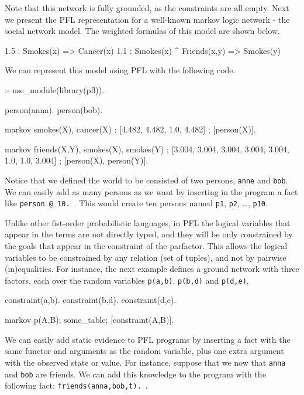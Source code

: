 \documentclass{article}
\begin{document}
Note that this network is fully grounded, as the constraints are all empty. Next we present the PFL representation for a well-known markov logic network - the social network model. The weighted formulas of this model are shown below.

\begin{pflcode}
1.5 : Smokes(x) => Cancer(x)
1.1 : Smokes(x) ^ Friends(x,y) => Smokes(y)
\end{pflcode}

We can represent this model using PFL with the following code.

\begin{pflcode}
:- use_module(library(pfl)).

person(anna).
person(bob).

markov smokes(X), cancer(X) ;
    [4.482, 4.482, 1.0, 4.482] ;
    [person(X)].

markov friends(X,Y), smokes(X), smokes(Y) ;
    [3.004, 3.004, 3.004, 3.004, 3.004, 1.0, 1.0, 3.004] ;
    [person(X), person(Y)].
\end{pflcode}

Notice that we defined the world to be consisted of two persons, \texttt{anne} and \texttt{bob}. We can easily add as many persons as we want by inserting in the program a fact like \texttt{person @ 10.}~. This would create ten persons named \texttt{p1}, \texttt{p2}, \dots, \texttt{p10}.

Unlike other fist-order probabilistic languages, in PFL the logical variables that appear in the terms are not directly typed, and they will be only constrained by the goals that appear in the constraint of the parfactor. This allows the logical variables to be constrained by any relation (set of tuples), and not by pairwise (in)equalities. For instance, the next example defines a ground network with three factors, each over the random variables \texttt{p(a,b)}, \texttt{p(b,d)} and \texttt{p(d,e)}.

\begin{pflcode}
constraint(a,b).
constraint(b,d).
constraint(d,e).

markov p(A,B); some_table; [constraint(A,B)].
\end{pflcode}

We can easily add static evidence to PFL programs by inserting a fact with the same functor and arguments as the random variable, plus one extra argument with the observed state or value. For instance, suppose that we now that \texttt{anna} and \texttt{bob} are friends. We can add this knowledge to the program with the following fact: \texttt{friends(anna,bob,t).}~.
\end{document}

